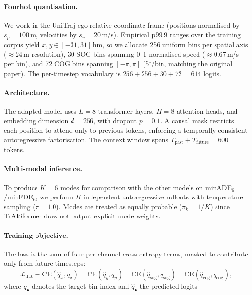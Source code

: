 \documentclass[12pt, a4paper]{article}
\begin{document}
\paragraph{Fourhot quantisation.}
We work in the UniTraj ego-relative coordinate frame (positions
normalised by $s_p = 100$\,m, velocities by $s_v = 20$\,m/s).
Empirical p99.9 ranges over the training corpus yield
$x, y \in [-31, 31]$\,hm, so we allocate 256 uniform bins per
spatial axis ($\approx 24$\,m resolution), 30 SOG bins spanning
0--1 normalised speed ($\approx 0.67$\,m/s per bin), and 72 COG bins
spanning $[-\pi, \pi]$ (5$^{\circ}$/bin, matching the original paper).
The per-timestep vocabulary is $256 + 256 + 30 + 72 = 614$ logits.

\paragraph{Architecture.}
The adapted model uses $L=8$ transformer layers, $H=8$ attention heads,
and embedding dimension $d=256$, with dropout $p=0.1$.
A causal mask restricts each position to attend only to previous tokens,
enforcing a temporally consistent autoregressive factorisation.
The context window spans $T_{\text{past}} + T_{\text{future}} = 600$
tokens.

\paragraph{Multi-modal inference.}
To produce $K=6$ modes for comparison with the other models on
minADE$_6$/minFDE$_6$, we perform $K$ independent autoregressive rollouts
with temperature sampling ($\tau = 1.0$).
Modes are treated as equally probable ($\pi_k = 1/K$) since TrAISformer
does not output explicit mode weights.

\paragraph{Training objective.}
The loss is the sum of four per-channel cross-entropy terms, masked to
contribute only from future timesteps:
\begin{equation}
  \mathcal{L}_{\text{TR}} =
  \text{CE}(\hat{q}_x, q_x) + \text{CE}(\hat{q}_y, q_y) +
  \text{CE}(\hat{q}_{\text{sog}}, q_{\text{sog}}) +
  \text{CE}(\hat{q}_{\text{cog}}, q_{\text{cog}}),
  \label{eq:traisformer_loss}
\end{equation}
where $q_{\bullet}$ denotes the target bin index and $\hat{q}_{\bullet}$
the predicted logits.
\end{document}
